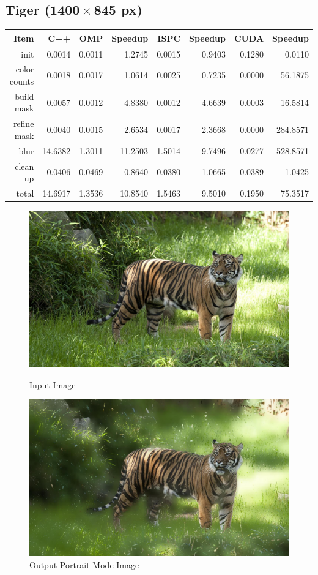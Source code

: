 \documentclass[12pt]{article}
\begin{document}
\subsection{Tiger ($\mathbf{1400 \times 845}$ px)}

\begin{tabular}{r|r|r|r|r|r|r|r}
    Item & C++ & OMP & Speedup & ISPC & Speedup & CUDA & Speedup
\\  \hline
    init & 0.0014 & 0.0011 & 1.2745 & 0.0015 & 0.9403 & 0.1280 & 0.0110
\\  color counts & 0.0018 & 0.0017 & 1.0614 & 0.0025 & 0.7235 & 0.0000 & 56.1875
\\  build mask & 0.0057 & 0.0012 & 4.8380 & 0.0012 & 4.6639 & 0.0003 & 16.5814
\\  refine mask & 0.0040 & 0.0015 & 2.6534 & 0.0017 & 2.3668 & 0.0000 & 284.8571
\\  blur & 14.6382 & 1.3011 & 11.2503 & 1.5014 & 9.7496 & 0.0277 & 528.8571
\\  clean up & 0.0406 & 0.0469 & 0.8640 & 0.0380 & 1.0665 & 0.0389 & 1.0425
\\  \hline
    total & 14.6917 & 1.3536 & 10.8540 & 1.5463 & 9.5010 & 0.1950 & 75.3517
\end{tabular}

\begin{figure}[!htb]
    \begin{minipage}{0.48\textwidth}
        \centering
        \includegraphics[width=0.75\linewidth]{tiger.jpg}
        \caption{Input Image}
    \end{minipage}\hfill
    \begin{minipage}{0.48\textwidth}
        \centering
        \includegraphics[width=0.75\linewidth]{tiger_portrait.jpg}
        \caption{Output Portrait Mode Image}
    \end{minipage}\hfill
\end{figure}
\end{document}
